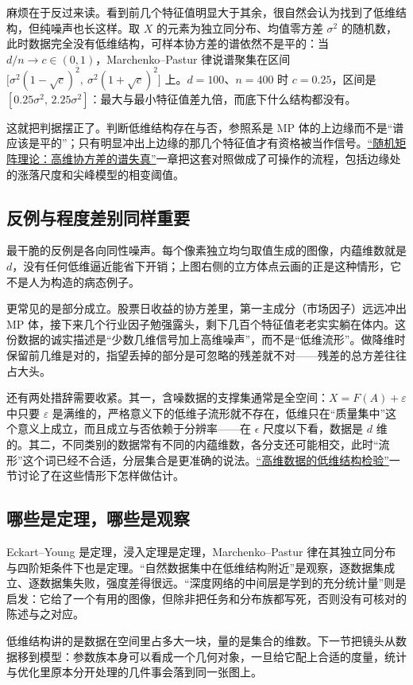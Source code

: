 麻烦在于反过来读。看到前几个特征值明显大于其余，很自然会认为找到了低维结构，但纯噪声也长这样。取 \(X\) 的元素为独立同分布、均值零方差 \(\sigma^2\) 的随机数，此时数据完全没有低维结构，可样本协方差的谱依然不是平的：当 \(d/n\to c\in(0,1)\)，Marchenko--Pastur 律说谱聚集在区间 \(\big[\sigma^2(1-\sqrt c)^2,\ \sigma^2(1+\sqrt c)^2\big]\) 上。\(d=100\)、\(n=400\) 时 \(c=0.25\)，区间是 \([0.25\sigma^2,\,2.25\sigma^2]\)：最大与最小特征值差九倍，而底下什么结构都没有。

这就把判据摆正了。判断低维结构存在与否，参照系是 MP 体的上边缘而不是``谱应该是平的''；只有明显冲出上边缘的那几个特征值才有资格被当作信号。\hyperref[ch:094]{``随机矩阵理论：高维协方差的谱失真''}一章把这套对照做成了可操作的流程，包括边缘处的涨落尺度和尖峰模型的相变阈值。

\subsection{反例与程度差别同样重要}

最干脆的反例是各向同性噪声。每个像素独立均匀取值生成的图像，内蕴维数就是 \(d\)，没有任何低维逼近能省下开销；上图右侧的立方体点云画的正是这种情形，它不是人为构造的病态例子。

更常见的是部分成立。股票日收益的协方差里，第一主成分（市场因子）远远冲出 MP 体，接下来几个行业因子勉强露头，剩下几百个特征值老老实实躺在体内。这份数据的诚实描述是``少数几维信号加上高维噪声''，而不是``低维流形''。做降维时保留前几维是对的，指望丢掉的部分是可忽略的残差就不对——残差的总方差往往占大头。

还有两处措辞需要收紧。其一，含噪数据的支撑集通常是全空间：\(X=F(A)+\varepsilon\) 中只要 \(\varepsilon\) 是满维的，严格意义下的低维子流形就不存在，低维只在``质量集中''这个意义上成立，而且成立与否依赖于分辨率——在 \(\epsilon\) 尺度以下看，数据是 \(d\) 维的。其二，不同类别的数据常有不同的内蕴维数，各分支还可能相交，此时``流形''这个词已经不合适，分层集合是更准确的说法。\hyperref[sec:14-Deep-Learning/10-Interpretability-Mathematics/03]{``高维数据的低维结构检验''}一节讨论了在这些情形下怎样做估计。

\subsection{哪些是定理，哪些是观察}

Eckart--Young 是定理，浸入定理是定理，Marchenko--Pastur 律在其独立同分布与四阶矩条件下也是定理。``自然数据集中在低维结构附近''是观察，逐数据集成立、逐数据集失败，强度差得很远。``深度网络的中间层是学到的充分统计量''则是启发：它给了一个有用的图像，但除非把任务和分布族都写死，否则没有可核对的陈述与之对应。

低维结构讲的是数据在空间里占多大一块，量的是集合的维数。下一节把镜头从数据移到模型：参数族本身可以看成一个几何对象，一旦给它配上合适的度量，统计与优化里原本分开处理的几件事会落到同一张图上。

